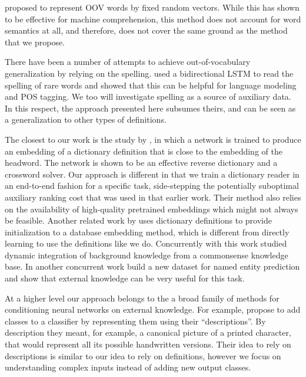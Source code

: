 \citep{dhingra_comparative_2017} proposed to represent OOV words by fixed random vectors. While this has shown to be effective for machine comprehension, this method does not account for word semantics at all, and therefore, does not cover the same ground as the method that we propose.

There have been a number of attempts to achieve out-of-vocabulary generalization by relying on the spelling. \citep{ling2015finding} used a bidirectional LSTM to read the spelling of rare words and showed that this can be helpful for language modeling and POS tagging. We too will investigate spelling as a source of auxiliary data. In this respect, the approach presented here subsumes theirs, and can be seen as a generalization to other types of definitions. 

The closest to our work is the study by \citet{hill2016learning}, in which a network is trained to produce an embedding of a dictionary definition that is close to the embedding of the headword. The network is shown to be an effective reverse dictionary and a crossword solver. Our approach is different in that we train a dictionary reader in an end-to-end fashion for a specific task, side-stepping the potentially suboptimal auxiliary ranking cost that was used in that earlier work. Their method also relies on the availability of high-quality pretrained embeddings which might not always be feasible. Another related work by \citet{long2016leveraging} uses dictionary definitions to provide initialization to a database embedding method, which is different from directly learning to use the definitions like we do. Concurrently with this work \citet{weissenborn_dynamic_2017} studied dynamic  integration of background knowledge from a commonsense knowledge base. In another concurrent work \citet{long2017world} build a new dataset for named entity prediction and show that external knowledge can be very useful for this task.

At a higher level our approach belongs to the a broad family of methods for conditioning neural networks on external knowledge. For example, \citet{larochelle2008zerodata} propose to add classes to a classifier by representing them using their ``descriptions''. By description they meant, for example, a canonical picture of a printed character, that would represent all its possible handwritten versions. Their idea to rely on descriptions is similar to our idea to rely on definitions, however we focus on understanding complex inputs instead of adding new output classes. 

